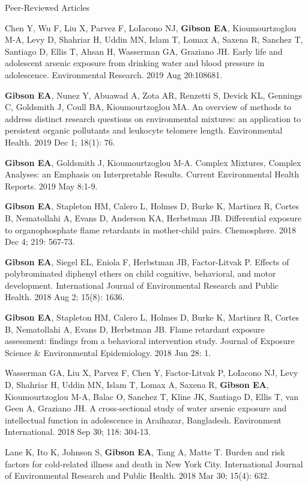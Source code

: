 \documentclass[a4paper,10pt]{article}
\newlength{\cvcolumngapwidth}
\newlength{\cvleftcolumnwidth}
\newlength{\cvrightcolumnwidth}
\newcommand{\cvdurationstyle}[1]{{\small\cvdurationfont\textcolor{cvdurationcolor}{#1}}}
\newlength{\cvafteritemskipamount}
\newlength{\cvparskip}
\newcommand{\cvitem}[2]{
    \begin{minipage}[t]{\cvleftcolumnwidth}
        \raggedleft #1
    \end{minipage}%
    \hspace{\cvcolumngapwidth}%
    \begin{minipage}[t]{\cvrightcolumnwidth}
        \setlength{\parskip}{\cvparskip} #2
    \end{minipage}

    \vspace{\cvafteritemskipamount}
}
\begin{document}
\cvitem{
    \cvdurationstyle{Peer-Reviewed Articles}
}{  
    \begin{etaremune}
	\item Chen Y, Wu F, Liu X, Parvez F, LoIacono NJ, \textbf{Gibson EA}, Kioumourtzoglou M-A, Levy D, Shahriar H, Uddin MN, Islam T, Lomax A, Saxena R, Sanchez T, Santiago D, Ellis T, Ahsan H, Wasserman GA, Graziano JH. Early life and adolescent arsenic exposure from drinking water and blood pressure in adolescence. Environmental Research. 2019 Aug 20:108681.	
	\item \textbf{Gibson EA}, Nunez Y, Abuawad A, Zota AR, Renzetti S, Devick KL, Gennings C, Goldsmith J, Coull BA, Kioumourtzoglou MA. An overview of methods to address distinct research questions on environmental mixtures: an application to persistent organic pollutants and leukocyte telomere length. Environmental Health. 2019 Dec 1; 18(1): 76. 
	\item \textbf{Gibson EA}, Goldsmith J, Kioumourtzoglou M-A. Complex Mixtures, Complex Analyses: an Emphasis on Interpretable Results. Current Environmental Health Reports. 2019 May 8:1-9. \\
	\item \textbf{Gibson EA}, Stapleton HM, Calero L, Holmes D, Burke K, Martinez R, Cortes B, Nematollahi A, Evans D, Anderson KA, Herbstman JB. Differential exposure to organophosphate flame retardants in mother-child pairs. Chemosphere. 2018 Dec 4; 219: 567-73. 
	\item \textbf{Gibson EA}, Siegel EL, Eniola F, Herbstman JB, Factor-Litvak P. Effects of polybrominated diphenyl ethers on child cognitive, behavioral, and motor development. International Journal of Environmental Research and Public Health. 2018 Aug 2; 15(8): 1636. 
	\item \textbf{Gibson EA}, Stapleton HM, Calero L, Holmes D, Burke K, Martinez R, Cortes B, Nematollahi A, Evans D, Herbstman JB. Flame retardant exposure assessment: findings from a behavioral intervention study. Journal of Exposure Science \& Environmental Epidemiology. 2018 Jun 28: 1. 
	\item Wasserman GA, Liu X, Parvez F, Chen Y, Factor-Litvak P, LoIacono NJ, Levy D, Shahriar H, Uddin MN, Islam T, Lomax A, Saxena R, \textbf{Gibson EA}, Kioumourtzoglou M-A, Balac O, Sanchez T, Kline JK, Santiago D, Ellis T, van Geen A, Graziano JH. A cross-sectional study of water arsenic exposure and intellectual function in adolescence in Araihazar, Bangladesh. Environment International. 2018 Sep 30; 118: 304-13.
	\item Lane K, Ito K, Johnson S, \textbf{Gibson EA}, Tang A, Matte T. Burden and risk factors for cold-related illness and death in New York City. International Journal of Environmental Research and Public Health. 2018 Mar 30; 15(4): 632. 
    \end{etaremune}
}
\end{document}
